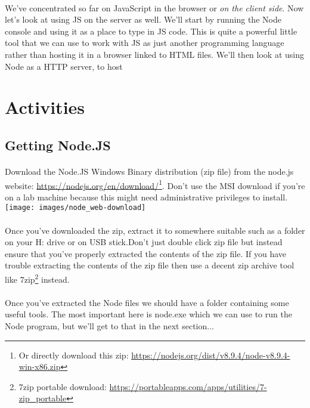 \documentclass[10pt, a4paper, twosize]{article}
\begin{document}
\paragraph{} We've concentrated so far on JavaScript in the browser or \emph{on the client side}. Now let's look at using JS on the server as well. We'll start by running the Node console and using it as a place to type in JS code. This is quite a powerful little tool that we can use to work with JS as just another programming language rather than hosting it in a browser linked to HTML files. We'll then look at using Node as a HTTP server, to host 

\section{Activities}

\subsection{Getting Node.JS}

\paragraph{} Download the Node.JS Windows Binary distribution (zip file) from the node.js website: \url{https://nodejs.org/en/download/}\footnote{Or directly download this zip: \url{https://nodejs.org/dist/v8.9.4/node-v8.9.4-win-x86.zip}}. Don't use the MSI download if you're on a lab machine because this might need administrative privileges to install.\\ 

\texttt{[image: images/node\_web-download]}

\paragraph{} Once you've downloaded the zip, extract it to somewhere suitable such as a folder on your H: drive or on USB stick.Don't just double click zip file but instead ensure that you've properly extracted the contents of the zip file. If you have trouble extracting the contents of the zip file then use a decent zip archive tool like 7zip\footnote{7zip portable download: \url{https://portableapps.com/apps/utilities/7-zip_portable}} instead.

\paragraph{} Once you've extracted the Node files we should have a folder containing some useful tools. The most important here is node.exe which we can use to run the Node program, but we'll get to that in the next section...
\end{document}
